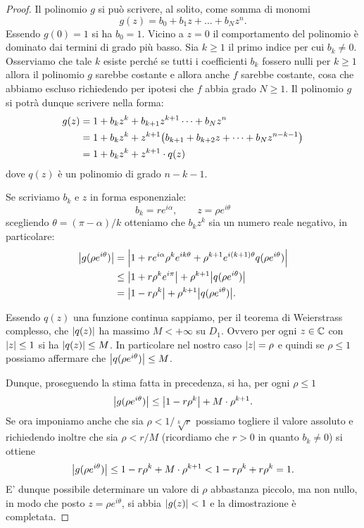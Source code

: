 \begin{proof}
Il polinomio $g$ si può scrivere, al solito, come somma di monomi
\[
  g(z) = b_0 + b_1 z + \dots + b_N z^n.
\]
Essendo $g(0)=1$ si ha $b_0=1$. Vicino a $z=0$ il comportamento del polinomio è dominato dai termini di grado più basso.
Sia $k\ge 1$ il primo indice per cui $b_k\neq 0$. Osserviamo che tale $k$ esiste perché se tutti i coefficienti $b_k$ fossero nulli per $k\ge 1$
allora
il polinomio $g$ sarebbe costante e allora anche $f$ sarebbe costante, cosa che abbiamo escluso richiedendo per ipotesi che $f$ abbia grado $N\ge 1$.
Il polinomio $g$
si potrà dunque scrivere nella forma:
\begin{align*}
  g(z) &= 1 + b_k z^k + b_{k+1} z^{k+1}\dots + b_N z^n \\
       &= 1 + b_k z^k + z^{k+1}{\left( b_{k+1} + b_{k+2}z + \dots + b_N
       z^{n-k-1} \right)}\\
       &= 1 + b_k z^k + z^{k+1} \cdot q(z)
\end{align*}
dove $q(z)$ è un polinomio di grado $n-k-1$.

Se scriviamo $b_k$ e $z$ in forma esponenziale:
\[
  b_k = r e^{i\alpha}, \qquad
  z = \rho e^{i\theta}
\]
scegliendo $\theta = (\pi - \alpha)/k$ otteniamo che $b_k z^k$ sia un numero reale negativo, in particolare:
\begin{align*}
  {\left|g(\rho e^{i\theta})\right|}
    &= {\left|1 + r e^{i\alpha} \rho^k e^{ik\theta}
    +  \rho^{k+1} e^{i(k+1)\theta} q (\rho e^{i\theta})\right|} \\
    & \le  {\left|1 + r \rho^k e^{i\pi}\right|} + \rho^{k+1} {\left|q(\rho e^{i\theta})\right|} \\
    &= {\left|1 - r \rho^k\right|} + \rho^{k+1} {\left|q(\rho e^{i\theta})\right|}.
\end{align*}

Essendo $q(z)$ una funzione continua sappiamo, per il teorema di Weierstrass complesso, che ${\left|q(z)\right|}$ ha massimo $M<+\infty$
su $D_1$.
Ovvero per ogni $z\in \mathbb C$ con ${\left|z\right|} \le 1$ si ha ${\left|q(z)\right|} \le M$.
In particolare nel nostro caso ${\left|z\right|}=\rho$ e quindi se $\rho \le 1$ possiamo affermare che ${\left|q(\rho e^{i\theta})\right|} \le M$.

Dunque, proseguendo la stima fatta in precedenza, si ha, per ogni $\rho \le 1$
\[
{\left|g(\rho e^{i\theta})\right|} \le {\left|1-r \rho^k\right|} + M\cdot \rho^{k+1}.
\]
Se ora imponiamo anche che sia $\rho < 1/\sqrt[k]{r}$ possiamo togliere il valore assoluto e
richiedendo inoltre che sia $\rho < r/M$ (ricordiamo che $r>0$ in quanto $b_k \neq 0$) si ottiene
\[
{\left|g(\rho e^{i\theta})\right|}
\le 1-r \rho^k + M\cdot \rho^{k+1}
< 1 - r \rho^k + r \rho^k = 1.
\]
E' dunque possibile determinare un valore di $\rho$ abbastanza piccolo, ma non nullo,
in modo che posto $z= \rho e^{i\theta}$, si abbia ${\left|g(z)\right|} < 1$ e la dimostrazione è completata.
\end{proof}

